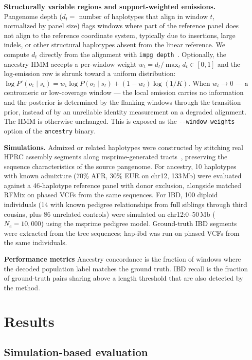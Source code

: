 \documentclass[10pt,twocolumn]{article}
\begin{document}
\textbf{Structurally variable regions and support-weighted emissions.}
Pangenome depth ($d_t = $ number of haplotypes that align in window $t$, normalized by panel size) flags windows where part of the reference panel does not align to the reference coordinate system, typically due to insertions, large indels, or other structural haplotypes absent from the linear reference. We compute $d_t$ directly from the alignment with \texttt{impg depth}~\cite{impg}. Optionally, the ancestry HMM accepts a per-window weight $w_t = d_t / \max_t d_t \in [0, 1]$ and the log-emission row is shrunk toward a uniform distribution: $\log P'(o_t \mid s_t) = w_t \log P(o_t \mid s_t) + (1 - w_t) \log(1/K)$. When $w_t \to 0$ — a centromeric or low-coverage window — the local emission carries no information and the posterior is determined by the flanking windows through the transition prior, instead of by an unreliable identity measurement on a degraded alignment. The HMM is otherwise unchanged. This is exposed as the \texttt{-{}-window-weights} option of the \texttt{ancestry} binary.

\textbf{Simulations.}
Admixed or related haplotypes were constructed by stitching real HPRC assembly segments along msprime-generated tracts~\cite{kelleher2016msprime}, preserving the sequence characteristics of the source pangenome. For ancestry, 10 haplotypes with known admixture (70\% AFR, 30\% EUR on chr12, 133\,Mb) were evaluated against a 46-haplotype reference panel with donor exclusion, alongside matched RFMix on phased VCFs from the same sequences. For IBD, 100 diploid individuals (14 with known pedigree relationships from full siblings through third cousins, plus 86 unrelated controls) were simulated on chr12:0--50\,Mb ($N_e{=}10{,}000$) using the msprime pedigree model. Ground-truth IBD segments were extracted from the tree sequences; hap-ibd was run on phased VCFs from the same individuals.

\textbf{Performance metrics} Ancestry concordance is the fraction of windows where the decoded population label matches the ground truth. IBD recall is the fraction of ground-truth pairs sharing above a length threshold that are also detected by the method.


\section{Results}


\subsection{Simulation-based evaluation}
\end{document}
